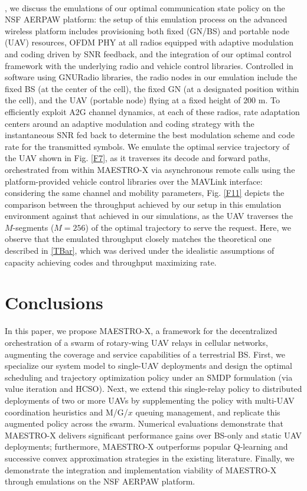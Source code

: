 \documentclass[10pt, twocolumn]{IEEEtran}
\theoremstyle{plain}
\theoremstyle{definition}
\theoremstyle{remark}
\begin{document}
\\, we discuss the emulations of our optimal communication state policy on the NSF AERPAW platform: the setup of this emulation process on the advanced wireless platform includes provisioning both fixed (GN/BS) and portable node (UAV) resources, OFDM PHY at all radios equipped with adaptive modulation and coding driven by SNR feedback, and the integration of our optimal control framework with the underlying radio and vehicle control libraries. Controlled in software using GNURadio libraries, the radio nodes in our emulation include the fixed BS (at the center of the cell), the fixed GN (at a designated position within the cell), and the UAV (portable node) flying at a fixed height of $200$ m. To efficiently exploit A2G channel dynamics, at each of these radios, rate adaptation centers around an adaptive modulation and coding strategy with the instantaneous SNR fed back to determine the best modulation scheme and code rate for the transmitted symbols. We emulate the optimal service trajectory of the UAV shown in Fig. \ref{F7}, as it traverses its decode and forward paths, orchestrated from within MAESTRO-X via asynchronous remote calls using the platform-provided vehicle control libraries over the MAVLink interface: considering the same channel and mobility parameters, Fig. \ref{F11} depicts the comparison between the throughput achieved by our setup in this emulation environment against that achieved in our simulations, as the UAV traverses the $M$-segments ($M{=}256$) of the optimal trajectory to serve the request. Here, we observe that the emulated throughput closely matches the theoretical one described in \eqref{TBar}, which was derived under the idealistic assumptions of capacity achieving codes and throughput maximizing rate.
\vspace{-4mm}


\section{Conclusions}\label{S7}

In this paper, we propose MAESTRO-X, a framework for the decentralized orchestration of a swarm of rotary-wing UAV relays in cellular networks, augmenting the coverage and service capabilities of a terrestrial BS. First, we specialize our system model to single-UAV deployments and design the optimal scheduling and trajectory optimization policy under an SMDP formulation (via value iteration and HCSO). Next, we extend this single-relay policy to distributed deployments of two or more UAVs by supplementing the policy with multi-UAV coordination heuristics and M/G/$x$ queuing management, and replicate this augmented policy across the swarm. Numerical evaluations demonstrate that MAESTRO-X delivers significant performance gains over BS-only and static UAV deployments; furthermore, MAESTRO-X outperforms popular Q-learning and successive convex approximation strategies in the existing literature. Finally, we demonstrate the integration and implementation viability of MAESTRO-X through emulations on the NSF AERPAW platform.
\vspace{-4mm}



 
\end{document}
